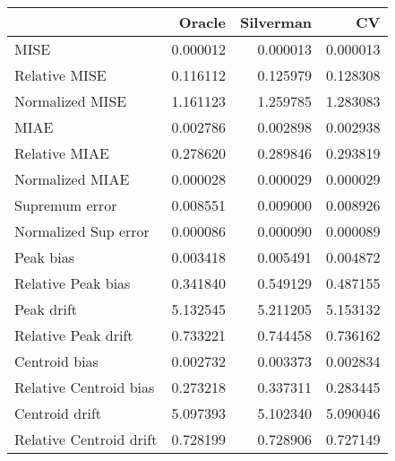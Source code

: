 \begin{tabular}{lrrr}
  \toprule
 & Oracle & Silverman & CV \\ 
  \midrule
MISE & 0.000012 & 0.000013 & 0.000013 \\ 
  Relative MISE & 0.116112 & 0.125979 & 0.128308 \\ 
  Normalized MISE & 1.161123 & 1.259785 & 1.283083 \\ 
  MIAE & 0.002786 & 0.002898 & 0.002938 \\ 
  Relative MIAE & 0.278620 & 0.289846 & 0.293819 \\ 
  Normalized MIAE & 0.000028 & 0.000029 & 0.000029 \\ 
  Supremum error & 0.008551 & 0.009000 & 0.008926 \\ 
  Normalized Sup error & 0.000086 & 0.000090 & 0.000089 \\ 
  Peak bias & 0.003418 & 0.005491 & 0.004872 \\ 
  Relative Peak bias & 0.341840 & 0.549129 & 0.487155 \\ 
  Peak drift & 5.132545 & 5.211205 & 5.153132 \\ 
  Relative Peak drift & 0.733221 & 0.744458 & 0.736162 \\ 
  Centroid bias & 0.002732 & 0.003373 & 0.002834 \\ 
  Relative Centroid bias & 0.273218 & 0.337311 & 0.283445 \\ 
  Centroid drift & 5.097393 & 5.102340 & 5.090046 \\ 
  Relative Centroid drift & 0.728199 & 0.728906 & 0.727149 \\ 
   \bottomrule
\end{tabular}
